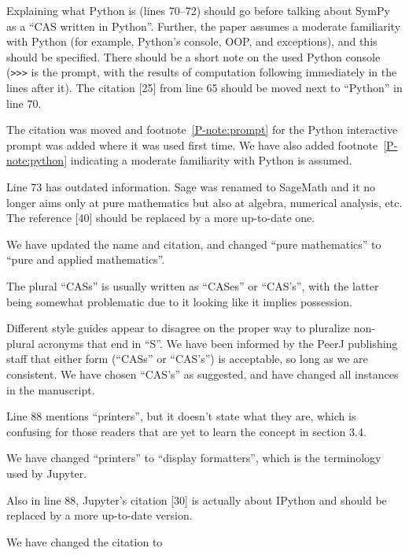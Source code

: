\documentclass[answers,12pt]{exam}
\begin{document}
\begin{questions}

\question Explaining what Python is (lines 70--72) should go before talking about SymPy as a ``CAS written in Python''. Further, the paper assumes a moderate familiarity with Python (for example, Python's console, OOP, and exceptions), and this should be specified. There should be a short note on the used Python console (\verb|>>>| is the prompt, with the results of computation following immediately in the lines after it). The citation [25] from line 65 should be moved next to ``Python'' in line 70.
\begin{solution}
The citation was moved and footnote~\ref{P-note:prompt} for the Python interactive prompt was
  added where it was used first time. We have also added footnote~\ref{P-note:python} indicating
  a moderate familiarity with Python is assumed.
\end{solution}

\question Line 73 has outdated information. Sage was renamed to SageMath and it no longer aims only at pure mathematics but also at algebra, numerical analysis, etc. The reference [40] should be replaced by a more up-to-date one.
\begin{solution}
We have updated the name and citation, and changed ``pure mathematics'' to
``pure and applied mathematics''.
\end{solution}

\question The plural ``CASs'' is usually written as ``CASes'' or ``CAS's'', with the latter being somewhat problematic due to it looking like it implies possession.
\begin{solution}
  Different style guides appear to disagree on the proper way to pluralize
  non-plural acronyms that end in ``S''. We have been informed by the PeerJ
  publishing staff that either form (``CASs'' or ``CAS's'') is acceptable, so
  long as we are consistent. We have chosen ``CAS's'' as suggested, and have
  changed all instances in the manuscript.
\end{solution}

\question Line 88 mentions ``printers'', but it doesn't state what they are, which is confusing for those readers that are yet to learn the concept in section 3.4.
\begin{solution}
We have changed ``printers'' to ``display formatters'', which is the
terminology used by Jupyter.
\end{solution}

\question Also in line 88, Jupyter's citation [30] is actually about IPython and should be replaced by a more up-to-date version.
\begin{solution}
We have changed the citation to


\end{solution}
\end{questions}
\end{document}
